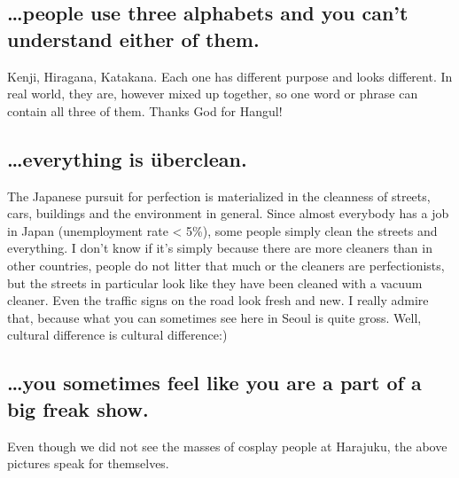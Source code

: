 \begin{post}
\begin{content}
\mbox{}

\subsection{{\ldots}people use three alphabets and you can't understand either of them.}
Kenji, Hiragana, Katakana. Each one has different purpose and looks different. In real world, they are, however mixed up together, so one word or phrase can contain all three of them. Thanks God for Hangul!

\subsection{{\ldots}everything is überclean.}
The Japanese pursuit for perfection is materialized in the cleanness of streets, cars, buildings and the environment in general. Since almost everybody has a job in Japan (unemployment rate < 5\%), some people simply clean the streets and everything. I don't know if it's simply because there are more cleaners than in other countries, people do not litter that much or the cleaners are perfectionists, but the streets in particular look like they have been cleaned with a vacuum cleaner. Even the traffic signs on the road look fresh and new. I really admire that, because what you can sometimes see here in Seoul is quite gross. Well, cultural difference is cultural difference:)

\subsection{{\ldots}you sometimes feel like you are a part of a big freak show.}
Even though we did not see the masses of cosplay people at Harajuku, the above pictures speak for themselves.\begin{figure}[!h]
\centering
{}
\end{figure}

\end{content}
\end{post}
